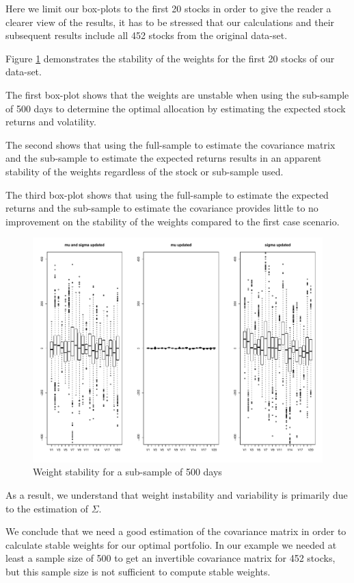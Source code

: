 \newpage
Here we limit our box-plots to the first 20 stocks in order to give the reader a clearer view of the results, it has to be stressed that our calculations and their subsequent results include all 452 stocks from the original data-set.
\par\smallskip
Figure \ref{fig1} demonstrates the stability of the weights for the first 20 stocks of our data-set.\par
The first box-plot shows that the weights are unstable when using the sub-sample of 500 days to determine the optimal allocation by estimating the expected stock returns and volatility.\par
The second shows that using the full-sample to estimate the covariance matrix and the sub-sample to estimate the expected returns results in an apparent stability of the weights regardless of the stock or sub-sample used.\par
The third box-plot shows that using the full-sample to estimate the expected returns and the sub-sample to estimate the covariance provides little to no improvement on the stability of the weights compared to the first case scenario. 

\begin{figure}[H]
\includegraphics[width=14cm]{Boxplot_question_1.pdf}
\caption{Weight stability for a sub-sample of 500 days}
\label{fig1}
\end{figure}

As a result, we understand that weight instability and variability is primarily due to the estimation of $\Sigma$.
\par\smallskip
We conclude that we need a good estimation of the covariance matrix in order to calculate stable weights for our optimal portfolio. In our example we needed at least a sample size of 500 to get an invertible covariance matrix for 452 stocks, but this sample size is not sufficient to compute stable weights.  
 
